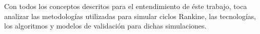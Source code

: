 \begin{itemize}
\end{itemize}


Con todos los conceptos descritos para el entendimiento de éste trabajo, toca analizar las metodologías utilizadas para simular ciclos Rankine, las tecnologías, los algoritmos y modelos de validación para dichas simulaciones.

\vspace{24pt}
